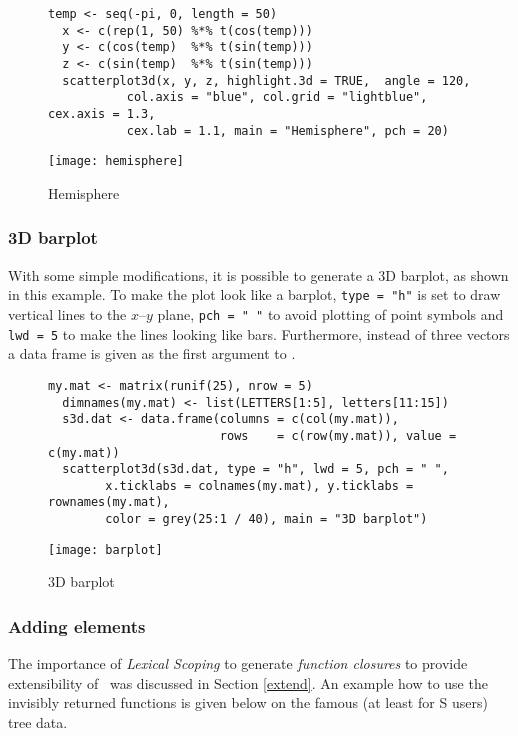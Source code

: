 \vspace*{10mm}
\begin{figure}[htb!]
\small
\begin{Verbatim}[frame=single]
  temp <- seq(-pi, 0, length = 50)
  x <- c(rep(1, 50) %*% t(cos(temp)))
  y <- c(cos(temp)  %*% t(sin(temp)))
  z <- c(sin(temp)  %*% t(sin(temp)))
  scatterplot3d(x, y, z, highlight.3d = TRUE,  angle = 120,
           col.axis = "blue", col.grid = "lightblue", cex.axis = 1.3,
           cex.lab = 1.1, main = "Hemisphere", pch = 20)
\end{Verbatim}
\normalsize
\begin{center}
\texttt{[image: hemisphere]}
\end{center}
\vspace*{-10mm}\caption{Hemisphere\label{hemisphere}}
\end{figure}


\clearpage\subsubsection{3D barplot}
With some simple modifications, it is possible to generate a 3D barplot, as shown in this example.
To make the plot look like a barplot, {\tt type = "h"} is set to draw vertical lines to the $x$--$y$ plane,
{\tt pch = " "} to avoid plotting of point symbols and {\tt lwd = 5} to make the lines looking like bars.
Furthermore, instead of three vectors a data frame is given as the first argument to \sdd .

\enlargethispage{1cm}
\vspace*{5mm}
\begin{figure}[htb!]
\small
\begin{Verbatim}[frame=single]
  my.mat <- matrix(runif(25), nrow = 5)
  dimnames(my.mat) <- list(LETTERS[1:5], letters[11:15])
  s3d.dat <- data.frame(columns = c(col(my.mat)),
                        rows    = c(row(my.mat)), value = c(my.mat))
  scatterplot3d(s3d.dat, type = "h", lwd = 5, pch = " ",
        x.ticklabs = colnames(my.mat), y.ticklabs = rownames(my.mat),
        color = grey(25:1 / 40), main = "3D barplot")
\end{Verbatim}
\normalsize
\begin{center}
\texttt{[image: barplot]}
\end{center}
\vspace*{-10mm}\caption{3D barplot\label{barplot}}
\end{figure}


\clearpage\subsubsection{Adding elements}
The importance of \textsl{Lexical Scoping} to generate \textsl{function closures}
to provide extensibility of \sdd\ was discussed in Section \ref{extend}.
An example how to use the invisibly returned functions is given below on the famous
(at least for \textsf{S} users) tree data.

